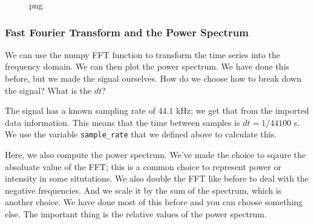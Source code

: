\begin{figure}
\centering
{}
\caption{png}
\end{figure}

\subsubsection{Fast Fourier Transform and the Power
Spectrum}\label{fast-fourier-transform-and-the-power-spectrum}

We can use the numpy FFT function to transform the time series into the
frequency domain. We can then plot the power spectrum. We have done this
before, but we made the signal ourselves. How do we choose how to break
down the signal? What is the \(dt\)?

The signal has a known sampling rate of 44.1 kHz; we get that from the
imported data information. This means that the time between samples is
\(dt = 1/44100\) s. We use the variable \texttt{sample\_rate} that we
defined above to calculate this.

Here, we also compute the power spectrum. We've made the choice to
sqaure the absoluate value of the FFT; this is a common choice to
represent power or intensity in some situtations. We also double the FFT
like before to deal with the negative frequencies. And we scale it by
the sum of the spectrum, which is another choice. We have done most of
this before and you can choose something else. The important thing is
the relative values of the power spectrum.

